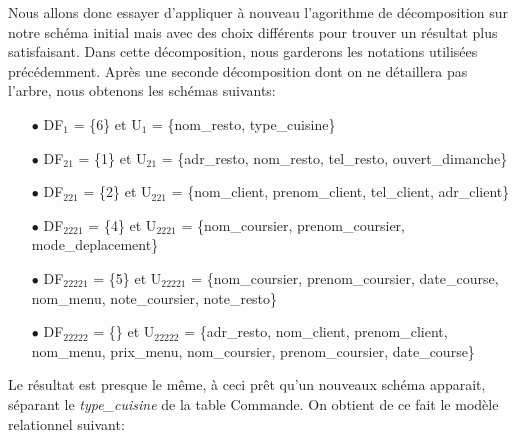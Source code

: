 \documentclass[french]{article}
\begin{document}
        Nous allons donc essayer d'appliquer à nouveau l'agorithme de décomposition sur notre schéma initial mais avec des choix différents pour trouver un résultat plus satisfaisant. Dans cette décomposition, nous garderons les notations utilisées précédemment.\newline
        Après une seconde décomposition dont on ne détaillera pas l'arbre, nous obtenons les schémas suivants:\bigskip
        \begin{enumerate}
            \item[$\bullet$] DF$_{1}$ = \{6\} et U$_{1}$ = \{nom\_resto, type\_cuisine\}
            \item[$\bullet$] DF$_{21}$ = \{1\} et U$_{21}$ = \{adr\_resto, nom\_resto, tel\_resto, ouvert\_dimanche\}
            \item[$\bullet$] DF$_{221}$ = \{2\} et U$_{221}$ = \{nom\_client, prenom\_client, tel\_client, adr\_client\}
            \item[$\bullet$] DF$_{2221}$ = \{4\} et U$_{2221}$ = \{nom\_coursier, prenom\_coursier, mode\_deplacement\}
            \item[$\bullet$] DF$_{22221}$ = \{5\} et U$_{22221}$ = \{nom\_coursier, prenom\_coursier, date\_course, nom\_menu, \newline note\_coursier, note\_resto\} 
            \item[$\bullet$] DF$_{22222}$ = \{\} et U$_{22222}$ = \{adr\_resto, nom\_client, prenom\_client, nom\_menu, prix\_menu, nom\_coursier, prenom\_coursier, date\_course\}\bigskip
        \end{enumerate}
        Le résultat est presque le même, à ceci prêt qu'un nouveaux schéma apparait, séparant le \emph{type\_cuisine} de la table Commande. On obtient de ce fait le modèle relationnel suivant:\bigskip
\end{document}
